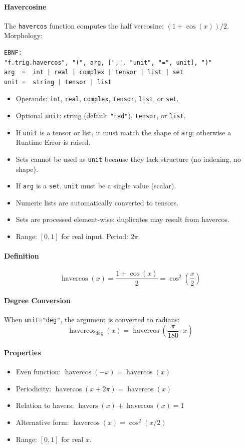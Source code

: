 \paragraph{Havercosine}
The \texttt{havercos} function computes the half vercosine: $(1 + \cos(x))/2$.\\
Morphology:
\begin{verbatim}
EBNF:
"f.trig.havercos", "(", arg, [",", "unit", "=", unit], ")"
arg  =  int | real | complex | tensor | list | set
unit =  string | tensor | list
\end{verbatim}
\begin{itemize}
\item Operands: \texttt{int}, \texttt{real}, \texttt{complex}, \texttt{tensor}, \texttt{list}, or \texttt{set}.
\item Optional \texttt{unit}: string (default \texttt{"rad"}), \texttt{tensor}, or \texttt{list}.
\item If \texttt{unit} is a tensor or list, it must match the shape of \texttt{arg}; otherwise a Runtime Error is raised.
\item Sets cannot be used as \texttt{unit} because they lack structure (no indexing, no shape).
\item If \texttt{arg} is a \texttt{set}, \texttt{unit} must be a single value (scalar).
\item Numeric lists are automatically converted to tensors.
\item Sets are processed element-wise; duplicates may result from havercos.
\item Range: $[0, 1]$ for real input. Period: $2\pi$.
\end{itemize}

\paragraph{Definition}
\[
\operatorname{havercos}(x) = \frac{1 + \cos(x)}{2} = \cos^2\left(\frac{x}{2}\right)
\]

\paragraph{Degree Conversion}
When \texttt{unit="deg"}, the argument is converted to radians:
\[
\operatorname{havercos}_{\text{deg}}(x) = \operatorname{havercos}\left(\frac{\pi}{180} \cdot x\right)
\]

\paragraph{Properties}
\begin{itemize}
\item Even function: $\operatorname{havercos}(-x) = \operatorname{havercos}(x)$
\item Periodicity: $\operatorname{havercos}(x + 2\pi) = \operatorname{havercos}(x)$
\item Relation to havers: $\operatorname{havers}(x) + \operatorname{havercos}(x) = 1$
\item Alternative form: $\operatorname{havercos}(x) = \cos^2(x/2)$
\item Range: $[0, 1]$ for real $x$.
\end{itemize}

